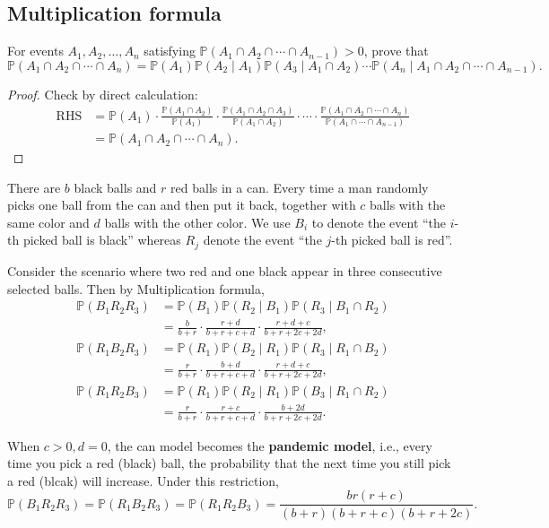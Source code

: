 \documentclass[11pt,singlecolumn, openany, citestyle=authoryear]{elegantbook}
\begin{document}
\begin{CJK}{UTF8}{gbsn}
\subsection{Multiplication formula}
\begin{theorem}
    For events $A_1, A_2, \ldots, A_n$ satisfying $\mathbb{P}\left(A_1 \cap A_2 \cap \cdots \cap A_{n-1}\right)>0$, prove that
$$
\mathbb{P}\left(A_1 \cap A_2 \cap \cdots \cap A_n\right)=\mathbb{P}\left(A_1\right) \mathbb{P}\left(A_2 \mid A_1\right) \mathbb{P}\left(A_3 \mid A_1 \cap A_2\right) \cdots \mathbb{P}\left(A_n \mid A_1 \cap A_2 \cap \cdots \cap A_{n-1}\right) .
$$
\end{theorem}
\begin{proof}
    Check by direct calculation:
    \begin{align*}
        \text{RHS} &= \mathbb{P}(A_1) \cdot \frac{\mathbb{P}(A_1\cap A_2)}{\mathbb{P}(A_1)}
        \cdot  \frac{\mathbb{P}(A_1\cap A_2 \cap A_3)}{\mathbb{P}(A_1 \cap A_2)}\cdot \cdots
        \cdot  \frac{\mathbb{P}(A_1\cap A_2 \cap \cdots \cap A_n)}{\mathbb{P}(A_1\cap\cdots
        \cap A_{n-1})}\\
        &= \mathbb{P}\left(A_1 \cap A_2 \cap \cdots \cap A_n\right).
    \end{align*}
\end{proof}

\begin{example}
    There are $b$ black balls and $r$ red balls in a can. Every time a man randomly picks
    one ball from the can and then put it back, together with $c$ balls with the same color
    and $d$ balls with the other color. We use $B_i$ to denote the event ``the $i$-th picked 
    ball is black'' whereas $R_j$ denote the event ``the $j$-th picked ball is red''.

    Consider the scenario where two red and one black appear in three consecutive selected balls.
    Then by Multiplication formula, 
    \begin{align*}
        \mathbb{P}(B_1R_2R_3) &= 
        \mathbb{P}(B_1)\mathbb{P}(R_2\mid B_1)\mathbb{P}(R_3 \mid B_1 \cap R_2) \\
        &= \frac{b}{b+r}\cdot \frac{r+d}{b+r+c+d}\cdot \frac{r+d+c}{b+r+2c+2d},\\
        \mathbb{P}(R_1B_2R_3) &= 
        \mathbb{P}(R_1)\mathbb{P}(B_2\mid R_1)\mathbb{P}(R_3 \mid R_1 \cap B_2) \\
        &= \frac{r}{b+r}\cdot \frac{b+d}{b+r+c+d}\cdot \frac{r+d+c}{b+r+2c+2d},\\
        \mathbb{P}(R_1R_2B_3) &= 
        \mathbb{P}(R_1)\mathbb{P}(R_2\mid R_1)\mathbb{P}(B_3 \mid R_1 \cap R_2) \\
        &= \frac{r}{b+r}\cdot \frac{r+c}{b+r+c+d}\cdot \frac{b+2d}{b+r+2c+2d}.
    \end{align*}
\end{example}
When $c>0,d=0$, the can model becomes the \textbf{pandemic model}, i.e., every time you pick 
a red (black) ball, the probability that the next time you still pick a red (blcak) will 
increase. Under this restriction,
$$
\mathbb{P}(B_1R_2R_3) = \mathbb{P}(R_1B_2R_3) = \mathbb{P}(R_1R_2B_3) =
\frac{br(r+c)}{(b+r)(b+r+c)(b+r+2c)}.
$$


\end{CJK}
\end{document}
